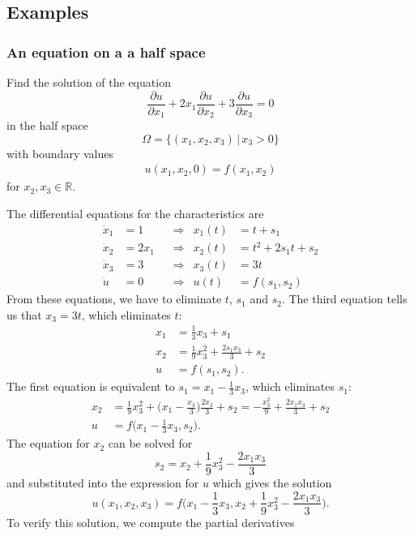 \subsection{Examples}
\subsubsection{An equation on a a half space}
Find the solution of the equation
\[
\frac{\partial u}{\partial x_1}
+
2x_1
\frac{\partial u}{\partial x_2}
+
3
\frac{\partial u}{\partial x_3}
=
0
\]
in the half space
\[
\Omega
=
\{
(x_1,x_2,x_3)
\,|\,
x_3>0
\}
\]
with boundary values
\begin{align*}
u(x_1,x_2,0) = f(x_1,x_2)
\end{align*}
for $x_2,x_3\in\mathbb{R}$.

The differential equations for the characteristics are
\begin{align*}
\dot{x}_1 &= 1    &&\Rightarrow&  x_1(t) &= t + s_1                 \\
\dot{x}_2 &= 2x_1 &&\Rightarrow&  x_2(t) &= t^2 + 2s_1t + s_2        \\
\dot{x}_3 &= 3    &&\Rightarrow&  x_3(t) &= 3t                      \\
\dot{u}   &= 0    &&\Rightarrow&  u(t)   &= f(s_1,s_2)
\end{align*}
From these equations, we have to eliminate $t$, $s_1$ and $s_2$.
The third equation tells us that $x_3=3t$, which eliminates $t$:
\begin{align*}
x_1 &= \frac13x_3 + s_1                   \\
x_2 &= \frac1{9}x_3^2 + \frac{2s_1x_3}3 + s_2 \\
u   &= f(s_1,s_2).
\end{align*}
The first equation is equivalent to $s_1=x_1-\frac13x_3$,
which eliminates $s_1$:
\begin{align*}
x_2
&=
\frac1{9}x_3^2 + \biggl(x_1-\frac{x_3}3\biggr)\frac{2x_3}3 + s_2
=
-\frac{x_3^2}{9}
+
\frac{2x_1x_3}{3} + s_2\\
u   &= f\biggl(x_1-\frac13x_3,s_2\biggr).
\end{align*}
The equation for $x_2$ can be solved for
\[
s_2
=
x_2+\frac{1}{9}x_3^2-\frac{2x_1x_3}3
\]
and substituted into the expression for $u$ which gives the solution
\begin{equation}
u(x_1,x_2,x_3)
=
f\biggl(x_1-\frac13x_3, x_2+\frac{1}{9}x_3^2-\frac{2x_1x_3}{3}\biggr).
\label{qlpden:ex1solution}
\end{equation}
To verify this solution, we compute the partial derivatives
